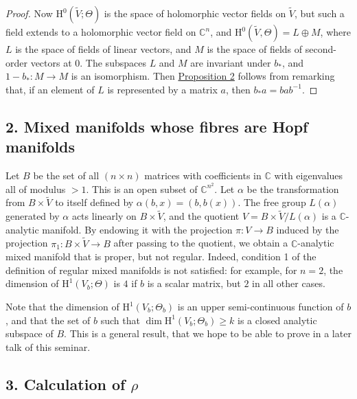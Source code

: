 \documentclass[british]{article}
\newcommand{\oldpage}[1]{\marginpar{\footnotesize$\Big\vert$ \textit{p.~#1}}}
\begin{document}
\begin{proof}
Now \(\mathrm{H}^0(\widetilde{V};\Theta)\) is the space of holomorphic
vector fields on \(\widetilde{V}\), but such a field extends to a
holomorphic vector field on \(\mathbb{C}^n\), and
\(\mathrm{H}^0(\widetilde{V},\Theta)=L\oplus M\), where \(L\) is the
space of fields of linear vectors, and \(M\) is the space of fields of
second-order vectors at \(0\). The subspaces \(L\) and \(M\) are
invariant under \(b_*\), and \(1-b_*\colon M\to M\) is an isomorphism.
Then \hyperref[three-proposition-2]{Proposition 2} follows from
remarking that, if an element of \(L\) is represented by a matrix \(a\),
then \(b_*a=bab^{-1}\).
\end{proof}

\subsection*{2. Mixed manifolds whose fibres are Hopf
manifolds}\label{three-section-III.2}

Let \(B\) be the set of all \((n\times n)\) matrices with coefficients
in \(\mathbb{C}\) with eigenvalues all of modulus \(>1\). \oldpage{3-06}
This is an open subset of \(\mathbb{C}^{n^2}\). Let \(\alpha\) be the
transformation from \(B\times\widetilde{V}\) to itself defined by
\(\alpha(b,x)=(b,b(x))\). The free group \(L(\alpha)\) generated by
\(\alpha\) acts linearly on \(B\times\widetilde{V}\), and the quotient
\(V=B\times\widetilde{V}/L(\alpha)\) is a \(\mathbb{C}\)-analytic
manifold. By endowing it with the projection \(\pi\colon V\to B\)
induced by the projection \(\pi_1\colon B\times\widetilde{V}\to B\)
after passing to the quotient, we obtain a \(\mathbb{C}\)-analytic mixed
manifold that is proper, but not regular. Indeed, condition 1 of the
definition of regular mixed manifolds is not satisfied: for example, for
\(n=2\), the dimension of \(\mathrm{H}^1(V_b;\Theta)\) is \(4\) if \(b\)
is a scalar matrix, but \(2\) in all other cases.

Note that the dimension of \(\mathrm{H}^1(V_b;\Theta_b)\) is an upper
semi-continuous function of \(b\), and that the set of \(b\) such that
\(\dim\mathrm{H}^1(V_b;\Theta_b)\geqslant k\) is a closed analytic
subspace of \(B\). This is a general result, that we hope to be able to
prove in a later talk of this seminar.

\subsection*{\texorpdfstring{3. Calculation of
\(\rho\)}{3. Calculation of \textbackslash rho}}\label{three-section-III.3}
\end{document}
